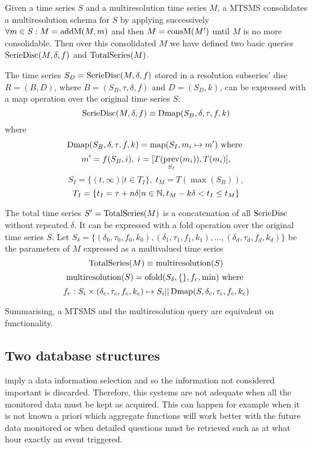 Given a time series $S$ and a multiresolution time series $M$, a MTSMS
consolidates a multiresolution schema for $S$ by applying successively
$\forall m \in S: M=\operatorname{addM}(M,m)$ and then $M=\operatorname{consM}(M')$ until $M$ is
no more consolidable. Then over this consolidated $M$ we have defined
two basic queries $\operatorname{SerieDisc}(M,\delta,f)$ and $\operatorname{TotalSeries}(M)$.

The time series $S_D=\operatorname{SerieDisc}(M,\delta,f)$ stored in a resolution
subseries' disc $R=(B,D)$, where $B=(S_B,\tau,\delta,f)$ and
$D=(S_D,k)$, can be expressed with a map operation over the original
time series $S$:
\[
\operatorname{SerieDisc}(M,\delta,f) \equiv \operatorname{Dmap}(S_B,\delta,\tau,f,k)
\]
where
\[
\operatorname{Dmap}(S_B,\delta,\tau,f,k) = \operatorname*{map}(S_I, m_i\mapsto m') \text{ where }
\]
\[
 m' = f(S_B, i),\;  i = [T(\operatorname*{prev}_{S_I}(m_i)),T(m_i)],
\]
\[
 S_I = \{ (t,\infty) | t\in T_I  \},\;  t_M = T(\max(S_B)),
\]
\[
T_I = \{ t_I = \tau+n\delta | n\in\mathbb{N}, t_M - k\delta < t_I \leq t_M \}
\]

The total time series $S'=\operatorname{TotalSeries}(M)$ is a concatenation of all
$\operatorname{SerieDisc}$ without repeated $\delta$. It can be expressed with a
fold operation over the original time series $S$. Let $S_\delta = \{
(\delta_0,\tau_0,f_0,k_0), (\delta_1,\tau_1,f_1,k_1), \ldots,
(\delta_d,\tau_d,f_d,k_d)\}$ be the parameters of $M$ expressed as a
multivalued time series
\[
\operatorname{TotalSeries}(M) \equiv \operatorname{multiresolution}(S)
\]
\[
\operatorname{multiresolution}(S) = \operatorname*{ofold}(S_\delta,\{\},f_r,\min) \text{ where }
\]
\[
f_r: S_i \times (\delta_c,\tau_c,f_c,k_c) \mapsto S_i ||
\operatorname{Dmap}(S,\delta_c,\tau_c,f_c,k_c)
\]


Summarising, a MTSMS and the multiresolution query are equivalent on
functionality.



\subsection{Two database structures}

 imply a data information selection and so the information
not considered important is discarded.  Therefore, this systems are
not adequate when all the monitored data must be kept as
acquired. This can happen for example when it is not known a priori
which aggregate functions will work better with the future data
monitored or when detailed questions must be retrieved such as at what
hour exactly an event triggered. 

